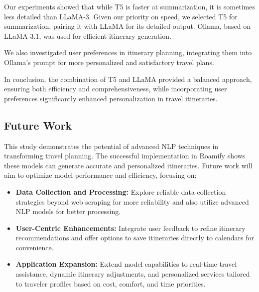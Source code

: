 \documentclass[manuscript,review,anonymous]{acmart}
\begin{document}
    Our experiments showed that while T5 is faster at summarization, it is sometimes less detailed than LLaMA-3. Given our priority on speed, we selected T5 for summarization, pairing it with LLaMA for its detailed output. Ollama, based on LLaMA 3.1, was used for efficient itinerary generation.
    
    We also investigated user preferences in itinerary planning, integrating them into Ollama's prompt for more personalized and satisfactory travel plans.
    
    In conclusion, the combination of T5 and LLaMA provided a balanced approach, ensuring both efficiency and comprehensiveness, while incorporating user preferences significantly enhanced personalization in travel itineraries.
    
    \vspace{-7pt}
    
    \subsection{Future Work}
        
        This study demonstrates the potential of advanced NLP techniques in transforming travel planning. The successful implementation in Roamify shows these models can generate accurate and personalized itineraries. Future work will aim to optimize model performance and efficiency, focusing on:
        \begin{itemize}
            \item \textbf{Data Collection and Processing:} Explore reliable data collection strategies beyond web scraping for more reliability and also utilize advanced NLP models for better processing.
            \item \textbf{User-Centric Enhancements:} Integrate user feedback to refine itinerary recommendations and offer options to save itineraries directly to calendars for convenience.
            \item \textbf{Application Expansion:} Extend model capabilities to real-time travel assistance, dynamic itinerary adjustments, and personalized services tailored to traveler profiles based on cost, comfort, and time priorities.
        \end{itemize}

\newpage
\end{document}
